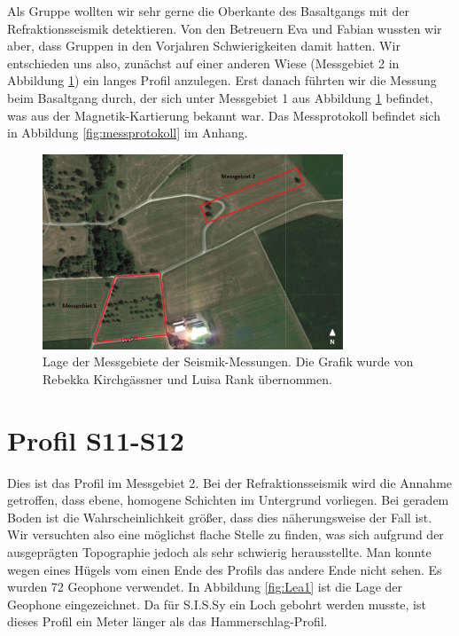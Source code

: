 Als Gruppe wollten wir sehr gerne die Oberkante des Basaltgangs mit der Refraktionsseismik detektieren. Von den Betreuern Eva und Fabian wussten wir aber, dass Gruppen in den Vorjahren Schwierigkeiten damit hatten. Wir entschieden uns also, zunächst auf einer anderen Wiese (Messgebiet 2 in Abbildung \ref{fig:MG}) ein langes Profil anzulegen. Erst danach führten wir die Messung beim Basaltgang durch, der sich unter Messgebiet 1 aus Abbildung \ref{fig:MG} befindet, was aus der Magnetik-Kartierung bekannt war. Das Messprotokoll befindet sich in Abbildung \ref{fig:messprotokoll} im Anhang.

\begin{figure}[!ht]
 \centering
 \includegraphics[width=0.8\textwidth]{fig/Messgebiete}
 \caption[Lage der Messgebiete der Seismik-Messungen]{Lage der Messgebiete der Seismik-Messungen. Die Grafik wurde von Rebekka Kirchgässner und Luisa Rank übernommen.}
 \label{fig:MG}
\end{figure}

\section{Profil S11-S12}

Dies ist das Profil im Messgebiet 2. Bei der Refraktionsseismik wird die Annahme getroffen, dass ebene, homogene Schichten im Untergrund vorliegen. Bei geradem Boden ist die Wahrscheinlichkeit größer, dass dies näherungsweise der Fall ist. Wir versuchten also eine möglichst flache Stelle zu finden, was sich aufgrund der ausgeprägten Topographie jedoch als sehr schwierig herausstellte. Man konnte wegen eines Hügels vom einen Ende des Profils das andere Ende nicht sehen. Es wurden 72 Geophone verwendet. In Abbildung \ref{fig:Lea1} ist die Lage der Geophone eingezeichnet. Da für S.I.S.Sy ein Loch gebohrt werden musste, ist dieses Profil ein Meter länger als das Hammerschlag-Profil.

